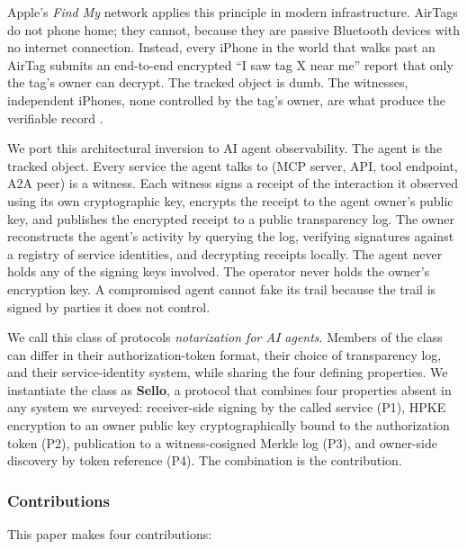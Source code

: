 \documentclass[
  11pt,
]{article}
\begin{document}
Apple's \emph{Find My} network applies this principle in modern
infrastructure. AirTags do not phone home; they cannot, because they are
passive Bluetooth devices with no internet connection. Instead, every
iPhone in the world that walks past an AirTag submits an end-to-end
encrypted ``I saw tag X near me'' report that only the tag's owner can
decrypt. The tracked object is dumb. The witnesses, independent iPhones,
none controlled by the tag's owner, are what produce the verifiable
record \citep{Heinrich2021}.

We port this architectural inversion to AI agent observability. The
agent is the tracked object. Every service the agent talks to (MCP
server, API, tool endpoint, A2A peer) is a witness. Each witness signs a
receipt of the interaction it observed using its own cryptographic key,
encrypts the receipt to the agent owner's public key, and publishes the
encrypted receipt to a public transparency log. The owner reconstructs
the agent's activity by querying the log, verifying signatures against a
registry of service identities, and decrypting receipts locally. The
agent never holds any of the signing keys involved. The operator never
holds the owner's encryption key. A compromised agent cannot fake its
trail because the trail is signed by parties it does not control.

We call this class of protocols \emph{notarization for AI agents}.
Members of the class can differ in their authorization-token format,
their choice of transparency log, and their service-identity system,
while sharing the four defining properties. We instantiate the class as
\textbf{Sello}, a protocol that combines four properties absent in any
system we surveyed: receiver-side signing by the called service (P1),
HPKE encryption to an owner public key cryptographically bound to the
authorization token (P2), publication to a witness-cosigned Merkle log
(P3), and owner-side discovery by token reference (P4). The combination
is the contribution.

\hypertarget{contributions}{%
\subsubsection{Contributions}\label{contributions}}

This paper makes four contributions:
\end{document}
